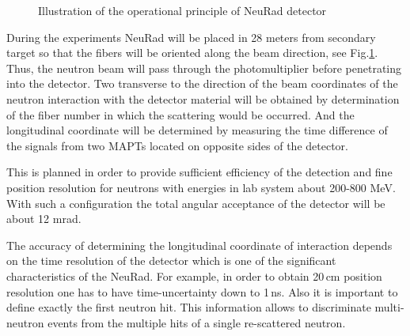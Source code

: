 \documentclass{webofc}
\begin{document}
\begin{figure}[h]
	\caption{Illustration of the operational principle of NeuRad detector}
	\label{ris:neuradPrinciple}
\end{figure}

During the experiments NeuRad will be placed in 28 meters from secondary target so that the fibers will be oriented along the beam direction, see Fig.\ref{ris:neuradPrinciple}.
Thus, the neutron beam will pass through the photomultiplier before penetrating into the detector.
Two transverse to the direction of the beam coordinates of the neutron interaction with the detector material will be obtained by determination of the fiber number in which the scattering would be occurred.
And the longitudinal coordinate will be determined by measuring the time difference of the signals from two MAPTs located on opposite sides of the detector.

This is planned in order to provide sufficient efficiency of the detection and fine position resolution for neutrons with energies in lab system about 200-800 MeV.
With such a configuration the total angular acceptance of the detector will be about 12 mrad.


The accuracy of determining the longitudinal coordinate of interaction depends on the time resolution of the detector which is one of the significant characteristics of the NeuRad. %
For example, in order to obtain 20\,cm position resolution one has to have time-uncertainty down to 1\,ns. Also it is important to define exactly the first neutron hit. This information allows to discriminate multi-neutron events from the multiple hits of a single re-scattered neutron.
\end{document}
